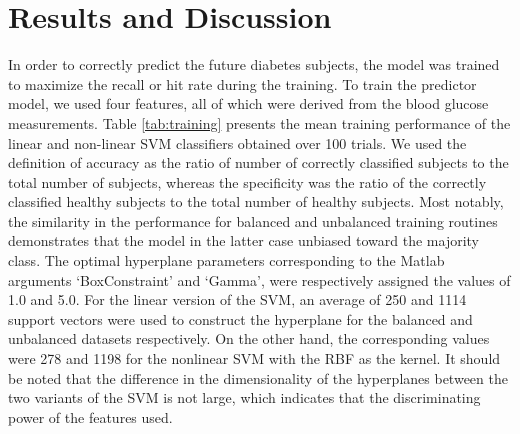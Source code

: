 \documentclass[journal,comsoc]{IEEEtran}
\renewcommand{\^}{\hat}  %
\begin{document}
%
\section{Results and Discussion}
%
%
In order to correctly predict the future diabetes subjects, the model was trained to maximize the recall or hit rate during the training. To train the predictor model, we used four features, all of which were derived from the blood glucose measurements. Table \ref{tab:training} presents the mean training performance of the linear and non-linear SVM classifiers obtained over \num{100} trials. We used the definition of accuracy as the ratio of number of correctly classified subjects to the total number of subjects, whereas the specificity was the ratio of the correctly classified healthy subjects to the total number of healthy subjects. Most notably, the similarity in the performance for balanced and unbalanced training routines demonstrates that the model in the latter case unbiased toward the majority class. The optimal hyperplane parameters corresponding to the Matlab arguments `BoxConstraint' and `Gamma', were respectively assigned the values of \num{1.0} and \num{5.0}. For the linear version of the SVM, an average of \num{250} and \num[group-minimum-digits=4, group-separator = {,}]{1114} support vectors were used to construct the hyperplane for the balanced and unbalanced datasets respectively. On the other hand, the corresponding values were \num{278} and \num[group-minimum-digits=4, group-separator = {,}]{1198} for the nonlinear SVM with the RBF as the kernel. It should be noted that the difference in the dimensionality of the hyperplanes between the two variants of the SVM is not large, which indicates that the discriminating power of the features used.
\end{document}
